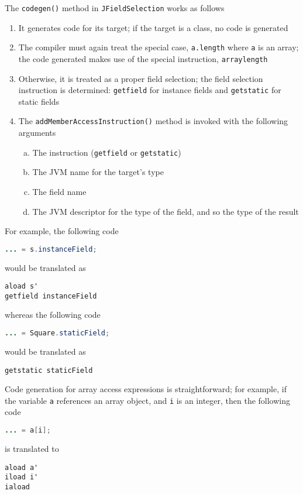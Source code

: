 \documentclass[8pt,a4paper,compress]{beamer}
\begin{document}
\begin{frame}[fragile]
\pause

The \lstinline{codegen()} method in \lstinline{JFieldSelection} works as follows
\begin{enumerate}
\item It generates code for its target; if the target is a class, no code is generated
\item The compiler must again treat the special case, \lstinline{a.length} where \lstinline{a} is an array; the code generated makes use of the special instruction, \lstinline{arraylength}
\item Otherwise, it is treated as a proper field selection; the field selection instruction is determined: \lstinline{getfield} for instance fields and \lstinline{getstatic} for static fields
\item The \lstinline{addMemberAccessInstruction()} method is invoked with the following arguments
\begin{enumerate}[(a)]
\item The instruction (\lstinline{getfield} or \lstinline{getstatic})
\item The JVM name for the target's type
\item The field name
\item The JVM descriptor for the type of the field, and so the type of the result
\end{enumerate}
\end{enumerate}
\end{frame}

\begin{frame}[fragile]
\pause

For example, the following code
\begin{lstlisting}[language=Java]
... = s.instanceField;
\end{lstlisting}
would be translated as
\begin{lstlisting}[language={}]
aload s'
getfield instanceField
\end{lstlisting}

whereas the following code
\begin{lstlisting}[language=Java]
... = Square.staticField;
\end{lstlisting}
would be translated as
\begin{lstlisting}[language={}]
getstatic staticField
\end{lstlisting}

\pause
\bigskip

Code generation for array access expressions is straightforward; for example, if the variable \lstinline{a} references an array object, and \lstinline{i} is an integer, then the following code
\begin{lstlisting}[language=Java]
... = a[i];
\end{lstlisting}
is translated to 
\begin{lstlisting}[language={}]
aload a'
iload i'
iaload
\end{lstlisting}
\end{frame}
\end{document}
